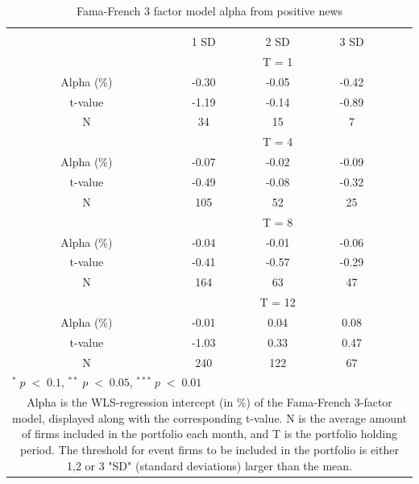 \setlength{\tabcolsep}{15pt}
\begin{table}[]
\small
\centering
\caption{Fama-French 3 factor model alpha from positive news } 
\begin{tabular}{ccccccc}
\hline \hline \\ 
 &     &  &    1 SD  &  2 SD  &  3 SD  &  \\ \cline{4-6} 
& & & \multicolumn{3}{c}{ T = 1} & \\ \cline{2-6}
& Alpha (\%)  &  & -0.30  & -0.05  & -0.42 &  \\
& t-value &  & -1.19 & -0.14  & -0.89 & \\
&  N       &  &  34    & 15 & 7 &\\
& & & \multicolumn{3}{c}{ T = 4} & \\ \cline{2-6}
& Alpha (\%)  &  & -0.07  & -0.02  &  -0.09 & \\
& t-value &  & -0.49 & -0.08  & -0.32 & \\
& N       &  & 105     & 52  & 25 & \\
& & & \multicolumn{3}{c}{ T = 8} & \\ \cline{2-6}
& Alpha (\%)  &  & -0.04   & -0.01  & -0.06 &  \\
& t-value &  & -0.41  & -0.57 & -0.29 & \\
& N       &  & 164 & 63   & 47 & \\
&  & & \multicolumn{3}{c}{ T = 12} & \\ \cline{2-6}
& Alpha (\%)  &  & -0.01  & 0.04  & 0.08 &  \\
& t-value &  & -1.03  & 0.33 & 0.47 & \\
& N       &  & 240    & 122  & 67 & \\ \hline \hline
 \multicolumn{7}{l}{ \footnotesize $^* \; p\; <\; 0.1$, $ ^{**} \; p\; <\; 0.05$, $ ^{***} \; p\; <\; 0.01$  } \\
 \multicolumn{7}{p{11.5cm}}{ \footnotesize Alpha is the WLS-regression intercept (in \%) of the Fama-French 3-factor model, displayed along with the corresponding t-value. N is the average amount of firms included in the portfolio each month, and T is the portfolio holding period. The threshold for event firms to be included in the portfolio is either 1,2 or 3 "SD" (standard deviations) larger than the mean.}  \\ 
\end{tabular}
\label{tab: FF3-pos}
\end{table}


